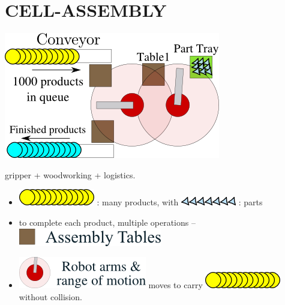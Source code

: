 \section{CELL-ASSEMBLY}
\label{sec-2}

\includegraphics[width=.6\textwidth]{img/model2a.png}

gripper + woodworking + logistics.

\begin{itemize}
\item \includegraphics[width=.6\textwidth]{img/products.png} : many products, with \includegraphics[width=.6\textwidth]{img/parts.png} : parts
\item to complete each product, multiple operations -- \includegraphics[width=.6\textwidth]{img/tables.png}
\item \includegraphics[width=.6\textwidth]{img/arms.png} moves to carry  \includegraphics[width=.6\textwidth]{img/products.png} without collision.
\end{itemize}

